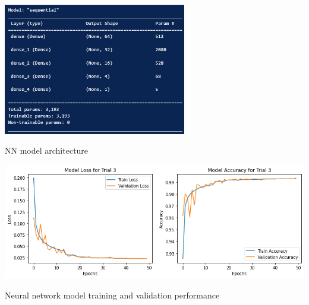 \documentclass{article}
\begin{document}
\begin{center}
  \centering
  \includegraphics[width=0.6\textwidth]{NN model summary.png} %
\end{center}
\begin{center}
  \footnotesize{NN model architecture}
\end{center}
\begin{center}
  \centering
  \includegraphics[width=1\textwidth]{NN model verbose.png} %
\end{center}
\begin{center}
  \footnotesize{Neural network model training and validation performance}
\end{center}
\end{document}
